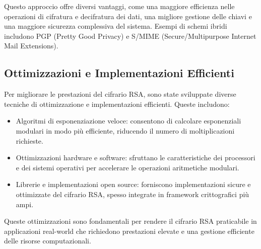 \documentclass[a4paper,12pt]{report}
\begin{document}
Questo approccio offre diversi vantaggi, come una maggiore efficienza nelle operazioni di cifratura e decifratura dei dati, una migliore gestione delle chiavi e una maggiore sicurezza complessiva del sistema. 
Esempi di schemi ibridi includono PGP (Pretty Good Privacy) e S/MIME (Secure/Multipurpose Internet Mail Extensions).

\subsection{Ottimizzazioni e Implementazioni Efficienti}
Per migliorare le prestazioni del cifrario RSA, sono state sviluppate diverse tecniche di ottimizzazione e implementazioni efficienti. Queste includono:

\begin{itemize}
   \item Algoritmi di esponenziazione veloce: consentono di calcolare esponenziali modulari in modo più efficiente, riducendo il numero di moltiplicazioni richieste.
   \item Ottimizzazioni hardware e software: sfruttano le caratteristiche dei processori e dei sistemi operativi per accelerare le operazioni aritmetiche modulari.
   \item Librerie e implementazioni open source: forniscono implementazioni sicure e ottimizzate del cifrario RSA, spesso integrate in framework crittografici più ampi.
\end{itemize}

Queste ottimizzazioni sono fondamentali per rendere il cifrario RSA praticabile in applicazioni real-world che richiedono prestazioni elevate e una gestione efficiente delle risorse computazionali.
\end{document}
